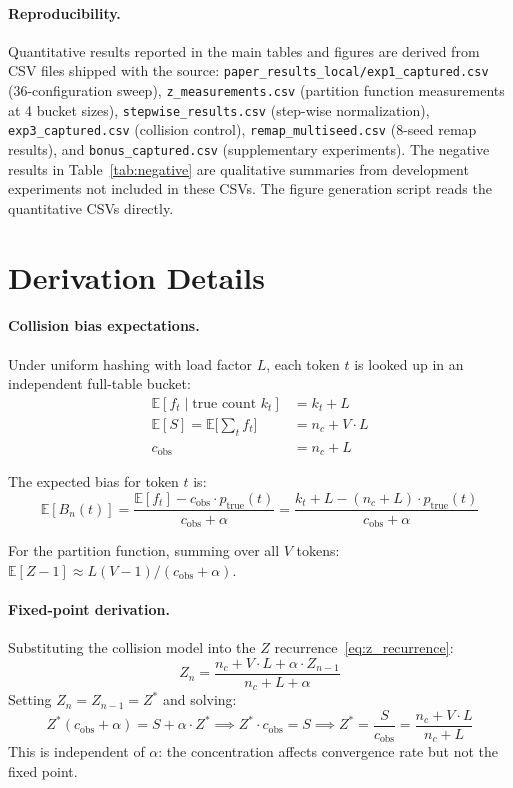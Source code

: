 \documentclass[11pt]{article}
\newcommand{\E}{\mathbb{E}}
\begin{document}
\paragraph{Reproducibility.} Quantitative results reported in the main tables and figures are derived from CSV files shipped with the source: \texttt{paper\_results\_local/exp1\_captured.csv} (36-configuration sweep), \texttt{z\_measurements.csv} (partition function measurements at 4 bucket sizes), \texttt{stepwise\_results.csv} (step-wise normalization), \texttt{exp3\_captured.csv} (collision control), \texttt{remap\_multiseed.csv} (8-seed remap results), and \texttt{bonus\_captured.csv} (supplementary experiments). The negative results in Table~\ref{tab:negative} are qualitative summaries from development experiments not included in these CSVs. The figure generation script reads the quantitative CSVs directly.

\section{Derivation Details}
\label{app:derivations}

\paragraph{Collision bias expectations.} Under uniform hashing with load factor $L$, each token $t$ is looked up in an independent full-table bucket:
\begin{align}
\E[f_t \mid \text{true count } k_t] &= k_t + L \\
\E[S] = \E\bigg[\sum_t f_t\bigg] &= n_c + V \cdot L \\
c_{\text{obs}} &= n_c + L
\end{align}

The expected bias for token $t$ is:
\[
\E[B_n(t)] = \frac{\E[f_t] - c_{\text{obs}} \cdot p_{\text{true}}(t)}{c_{\text{obs}} + \alpha} = \frac{k_t + L - (n_c + L) \cdot p_{\text{true}}(t)}{c_{\text{obs}} + \alpha}
\]

For the partition function, summing over all $V$ tokens: $\E[Z - 1] \approx L(V-1)/(c_{\text{obs}} + \alpha)$.

\paragraph{Fixed-point derivation.} Substituting the collision model into the $Z$ recurrence~\eqref{eq:z_recurrence}:
\[
Z_n = \frac{n_c + V \cdot L + \alpha \cdot Z_{n-1}}{n_c + L + \alpha}
\]
Setting $Z_n = Z_{n-1} = Z^*$ and solving:
\[
Z^*(c_{\text{obs}} + \alpha) = S + \alpha \cdot Z^* \implies Z^* \cdot c_{\text{obs}} = S \implies Z^* = \frac{S}{c_{\text{obs}}} = \frac{n_c + V \cdot L}{n_c + L}
\]
This is independent of $\alpha$: the concentration affects convergence rate but not the fixed point.
\end{document}
